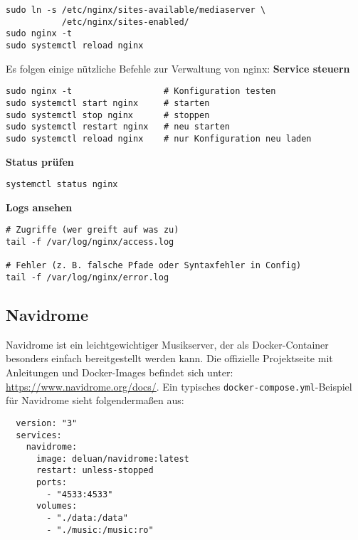 \documentclass[12pt,a4paper]{report}
\begin{document}
  \begin{verbatim}
sudo ln -s /etc/nginx/sites-available/mediaserver \
           /etc/nginx/sites-enabled/
sudo nginx -t
sudo systemctl reload nginx
  \end{verbatim}  

  Es folgen einige nützliche Befehle zur Verwaltung von nginx:
  \textbf{Service steuern}  
  \begin{verbatim}
sudo nginx -t                  # Konfiguration testen
sudo systemctl start nginx     # starten
sudo systemctl stop nginx      # stoppen
sudo systemctl restart nginx   # neu starten
sudo systemctl reload nginx    # nur Konfiguration neu laden
  \end{verbatim}

  \textbf{Status prüfen}  
  \begin{verbatim}
systemctl status nginx
  \end{verbatim}

  \textbf{Logs ansehen}  
  \begin{verbatim}
# Zugriffe (wer greift auf was zu)
tail -f /var/log/nginx/access.log

# Fehler (z. B. falsche Pfade oder Syntaxfehler in Config)
tail -f /var/log/nginx/error.log
  \end{verbatim}
 
  \subsection{Navidrome}  
  Navidrome ist ein leichtgewichtiger Musikserver, der als Docker-Container besonders einfach bereitgestellt werden kann.  
  Die offizielle Projektseite mit Anleitungen und Docker-Images befindet sich unter: \url{https://www.navidrome.org/docs/}.  
  Ein typisches \texttt{docker-compose.yml}-Beispiel für Navidrome sieht folgendermaßen aus:  
  \begin{verbatim}
  version: "3"
  services:
    navidrome:
      image: deluan/navidrome:latest
      restart: unless-stopped
      ports:
        - "4533:4533"
      volumes:
        - "./data:/data"
        - "./music:/music:ro"
  \end{verbatim} 
\end{document}
